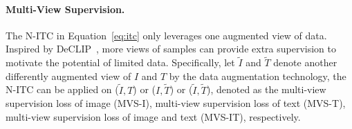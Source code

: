 \documentclass[letterpaper]{article} %
\begin{document}
\paragraph{Multi-View Supervision.}
The N-ITC in Equation~\ref{eq:itc} only leverages one augmented view of data. 
Inspired by DeCLIP~\cite{li2021supervision}, more views of samples can provide extra supervision to motivate the potential of limited data.
Specifically, let $\tilde{I}$ and $\tilde{T}$ denote another differently augmented view of $I$ and $T$ by the data augmentation technology, the N-ITC can be applied on ($\tilde{I}, T$) or ($I, \tilde{T}$) or ($\tilde{I}, \tilde{T}$), denoted as the multi-view supervision loss of image (MVS-I), multi-view supervision loss of text (MVS-T), multi-view supervision loss of image and text (MVS-IT), respectively.





\end{document}
